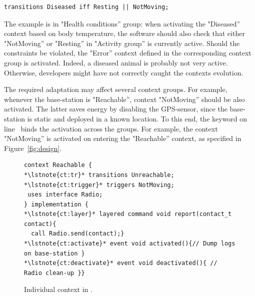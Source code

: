 \vspace{-1mm}
\begin{lstlisting}[language=conesc]
transitions Diseased iff Resting || NotMoving;
\end{lstlisting}
\vspace{-1.5mm}

The example is in "Health conditions'' group: when activating the "Diseased''
context based on body temperature, the software should also check that either
"NotMoving'' or "Resting'' in "Activity group'' is currently active. Should the
constraints be violated, the "Error'' context defined in the corresponding
context group is activated. Indeed, a diseased animal is probably not very
active. Otherwise, developers might have not correctly caught the contexts
evolution.

The required adaptation may affect several context groups. For example, whenever
the base-station is "Reachable'', context "NotMoving'' should be also activated.
The latter saves energy by disabling the GPS-sensor, since the base-station is
static and deployed in a known location. To this end, the keyword
 on line~ binds the activation across the
groups. For example, the context "NotMoving'' is activated on entering the
"Reachable'' context, as specified in Figure~\ref{fig:design}.


\begin{figure}[!tb]
\begin{lstlisting}[style=conescframe]
context Reachable {
*\lstnote{ct:tr}* transitions Unreachable;
*\lstnote{ct:trigger}* triggers NotMoving;
 uses interface Radio;
} implementation {
*\lstnote{ct:layer}* layered command void report(contact_t contact){
  call Radio.send(contact);}
*\lstnote{ct:activate}* event void activated(){// Dump logs on base-station }
*\lstnote{ct:deactivate}* event void deactivated(){ // Radio clean-up }}
\end{lstlisting}
\vspace{-3mm}
\caption{Individual context in \conesc.}
  \label{fig:context}
\vspace{-7mm}
\end{figure}
